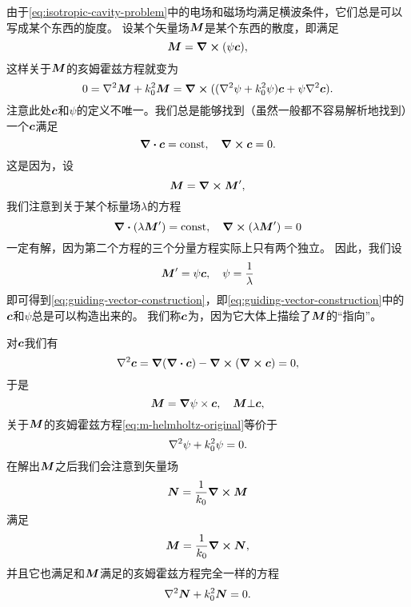 由于\eqref{eq:isotropic-cavity-problem}中的电场和磁场均满足横波条件，它们总是可以写成某个东西的旋度。
设某个矢量场$\vb*{M}$是某个东西的散度，即满足
\begin{equation}
    {\vb*{M}} = \curl{(\psi \vb*{c})},
    \label{eq:guiding-vector-construction}
\end{equation}
这样关于$\vb*{M}$的亥姆霍兹方程就变为
\begin{equation}
    0 = \laplacian {\vb*{M}} + k_0^2 {\vb*{M}} = \curl{((\laplacian \psi + k_0^2 \psi) \vb*{c} + \psi \laplacian \vb*{c})}.
    \label{eq:m-helmholtz-original}
\end{equation}
注意此处$\vb*{c}$和$\psi$的定义不唯一。我们总是能够找到（虽然一般都不容易解析地找到）一个$\vb*{c}$满足
\begin{equation}
    \div{\vb*{c}} = \text{const}, \quad \curl{\vb*{c}} = 0.
\end{equation}
这是因为，设
\[
    \vb*{M} = \curl{\vb*{M}'},
\]
我们注意到关于某个标量场$\lambda$的方程
\[
    \div{(\lambda \vb*{M}')} = \text{const}, \quad \curl{(\lambda \vb*{M}')} = 0
\]
一定有解，因为第二个方程的三个分量方程实际上只有两个独立。
因此，我们设
\[
    \vb*{M}' = \psi \vb*{c}, \quad \psi = \frac{1}{\lambda}
\]
即可得到\eqref{eq:guiding-vector-construction}，即\eqref{eq:guiding-vector-construction}中的$\vb*{c}$和$\psi$总是可以构造出来的。
我们称$\vb*{c}$为，因为它大体上描绘了$\vb*{M}$的“指向”。

对$\vb*{c}$我们有
\[
    \laplacian \vb*{c} = \grad(\div{\vb*{c}}) - \curl{(\curl{\vb*{c}})} = 0,
\]
于是
\begin{equation}
    \vb*{M} = \grad{\psi} \times \vb*{c}, \quad \vb*{M} \bot \vb*{c},
\end{equation}
关于$\vb*{M}$的亥姆霍兹方程\eqref{eq:m-helmholtz-original}等价于
\begin{equation}
    \laplacian \psi + k_0^2 \psi = 0.
    \label{eq:scalar-cavity-eq}
\end{equation}
在解出$\vb*{M}$之后我们会注意到矢量场
\begin{equation}
    \vb*{N} = \frac{1}{k_0} \curl{\vb*{M}}
    \label{eq:cavity-n-def}
\end{equation}
满足
\begin{equation}
    \vb*{M} = \frac{1}{k_0} \curl{\vb*{N}}, 
\end{equation}
并且它也满足和$\vb*{M}$满足的亥姆霍兹方程完全一样的方程
\begin{equation}
    \laplacian \vb*{N} + k_0^2 \vb*{N} = 0.
\end{equation}

